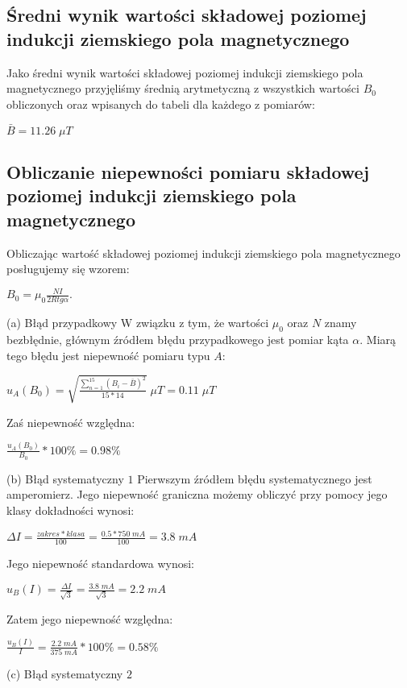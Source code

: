 \documentclass[12pt]{article}
\begin{document}
\subsection{Średni wynik wartości składowej poziomej indukcji ziemskiego pola magnetycznego}
Jako średni wynik wartości składowej poziomej indukcji ziemskiego pola magnetycznego przyjęliśmy średnią arytmetyczną z wszystkich wartości $B_0$ obliczonych oraz wpisanych do tabeli dla każdego z pomiarów:
\begin{center}
\Large $\bar{B} = 11.26\;\mu{T}$
\end{center}
\subsection{Obliczanie niepewności pomiaru składowej poziomej indukcji ziemskiego pola magnetycznego}
Obliczając wartość składowej poziomej indukcji ziemskiego pola magnetycznego posługujemy się wzorem:
\begin{center}
\Large $B_0=\mu_0\frac{NI}{2Rtg\alpha}. $
\end{center}
(a) Błąd przypadkowy \newline
W związku z tym, że wartości $\mu_0$ oraz $N$ znamy bezbłędnie, głównym źródłem błędu przypadkowego jest pomiar kąta $\alpha$. 
Miarą tego błędu jest niepewność pomiaru typu $A$:
\begin{center}
\Large $u_A(B_0) = \sqrt{\frac{\sum_{n=1}^{15} (B_i-\bar{B})^2}{15*14}}\;\mu{T} = 0.11\;\mu{T}$
\end{center}
Zaś niepewność względna:
\begin{center}
\Large $\frac{u_A(B_0)}{B_0}*100\% = 0.98\%$
\end{center}
(b) Błąd systematyczny $1$ \newline
Pierwszym źródłem błędu systematycznego jest amperomierz. Jego niepewność graniczna możemy obliczyć przy pomocy jego klasy dokładności wynosi:
\begin{center}
\Large $\Delta{I} = \frac{zakres*{klasa}}{100} = \frac{0.5*750\;mA}{100} = 3.8\;mA $
\end{center}
Jego niepewność standardowa wynosi:
\begin{center}
\Large $u_B(I) = \frac{\Delta{I}}{\sqrt{3}} = \frac{3.8\;mA}{\sqrt{3}}=2.2\;mA $
\end{center}
Zatem jego niepewność względna:
 \begin{center}
\Large $\frac{u_B(I)}{I} = \frac{2.2\;mA}{375\;mA}*100\% = 0.58\% $
\end{center}
(c) Błąd systematyczny $2$ \newline
\end{document}
